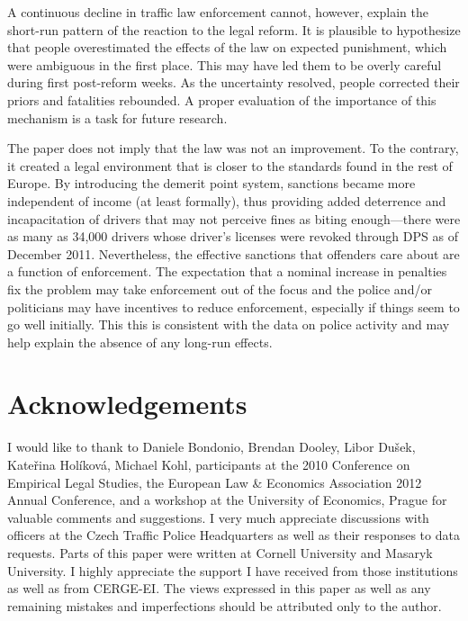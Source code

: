 \documentclass[12pt]{article}
\begin{document}
A continuous decline in traffic law enforcement cannot, however, explain the
short-run pattern of the reaction to the legal reform. It is plausible to
hypothesize that people overestimated the effects of the law on expected
punishment, which were ambiguous in the first place. This may have led them to
be overly careful during first post-reform weeks. As the uncertainty resolved,
people corrected their priors and fatalities rebounded. A proper evaluation of
the importance of this mechanism is a task for future research.

The paper does not imply that the law was not an improvement. To the contrary,
it created a legal environment that is closer to the standards found in the rest
of Europe. By introducing the demerit point system, sanctions became more
independent of income (at least formally), thus providing added deterrence and
incapacitation of drivers that may not perceive fines as biting enough---there
were as many as 34,000 drivers whose driver's licenses were revoked through DPS
as of December 2011. Nevertheless, the effective sanctions that offenders care
about are a function of enforcement. The expectation that a nominal increase in
penalties fix the problem may take enforcement out of the focus and the police
and/or politicians may have incentives to reduce enforcement, especially if
things seem to go well initially. This this is consistent with the data on
police activity and may help explain the absence of any long-run effects.
  
\section*{Acknowledgements}

I would like to thank to Daniele Bondonio, Brendan Dooley, Libor Dušek, Kateřina
Holíková, Michael Kohl, participants at the 2010 Conference on Empirical Legal
Studies, the European Law \& Economics Association 2012 Annual Conference, and a
workshop at the University of Economics, Prague for valuable comments and
suggestions. I very much appreciate discussions with officers at the Czech
Traffic Police Headquarters as well as their responses to data requests.  Parts
of this paper were written at Cornell University and Masaryk University. I
highly appreciate the support I have received from those institutions as well as
from CERGE-EI. The views expressed in this paper as well as any remaining
mistakes and imperfections should be attributed only to the author. 

\printbibliography
% 
\end{document}
